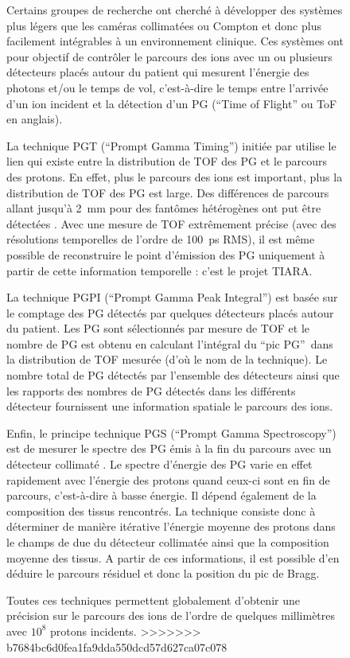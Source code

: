 \documentclass[11pt,a4paper,oldfontcommands]{memoir}
\begin{document}
\begin{figure}
Certains groupes de recherche ont cherché à développer des systèmes plus légers que les caméras collimatées ou Compton et donc plus facilement intégrables à un environnement clinique. Ces systèmes ont pour objectif de contrôler le parcours des ions avec un ou plusieurs détecteurs placés autour du patient qui mesurent l'énergie des photons et/ou le temps de vol, c'est-à-dire le temps entre l'arrivée d'un ion incident et la détection d'un  PG (\enquote{Time of Flight} ou ToF en anglais). 

La technique PGT (\enquote{Prompt Gamma Timing}) initiée par \cite{Golnik_2014} utilise le lien qui existe entre la distribution de TOF des PG et le parcours des protons. En effet, plus le parcours des ions est important, plus la distribution de TOF des PG est large. Des différences de parcours allant jusqu'à 2~mm pour des fantômes hétérogènes ont put être détectées \cite{Hueso_Gonz_lez_2015}. Avec une mesure de TOF extrêmement précise (avec des résolutions temporelles de l'ordre de 100~ps RMS), il est même possible de reconstruire le point d'émission des PG uniquement à partir de cette information temporelle : c'est le projet TIARA.

La technique PGPI (\enquote{Prompt Gamma Peak Integral}) est basée sur le comptage des PG détectés par quelques détecteurs placés autour du patient. Les PG sont sélectionnés par mesure de TOF et le nombre de PG est obtenu en calculant l'intégral du \enquote{pic PG} dans la distribution de TOF mesurée (d'où le nom de la technique). Le nombre total de PG détectés par l'ensemble des détecteurs ainsi que les rapports des nombres de PG détectés dans les différents détecteur fournissent une information spatiale le parcours des ions.

Enfin, le principe technique PGS (\enquote{Prompt Gamma Spectroscopy}) est de mesurer le spectre des PG émis à la fin du parcours avec un détecteur collimaté \cite{Testa_2014}.  Le spectre d'énergie des PG varie en effet rapidement avec l'énergie des protons quand ceux-ci sont en fin de parcours, c'est-à-dire à basse énergie. Il dépend également de la composition des tissus rencontrés. La technique consiste donc à déterminer de manière itérative l'énergie moyenne des protons dans le champs de due du détecteur collimatée ainsi que la composition moyenne des tissus. A partir de ces informations, il est possible d'en déduire le parcours résiduel et donc la position du pic de Bragg. 

Toutes ces techniques permettent globalement d'obtenir une précision sur le parcours des ions de l'ordre de quelques millimètres avec $10^8$ protons incidents.
>>>>>>> b7684bc6d0fea1fa9dda550dcd57d627ca07c078


\end{figure}
\end{document}
